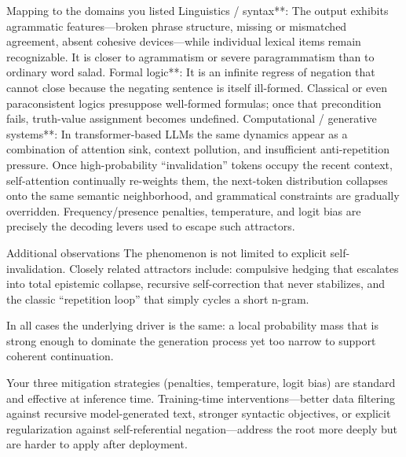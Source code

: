 Mapping to the domains you listed
Linguistics / syntax**: The output exhibits agrammatic features—broken phrase structure, missing or mismatched agreement, absent cohesive devices—while individual lexical items remain recognizable. It is closer to agrammatism or severe paragrammatism than to ordinary word salad.
Formal logic**: It is an infinite regress of negation that cannot close because the negating sentence is itself ill-formed. Classical or even paraconsistent logics presuppose well-formed formulas; once that precondition fails, truth-value assignment becomes undefined.
Computational / generative systems**: In transformer-based LLMs the same dynamics appear as a combination of attention sink, context pollution, and insufficient anti-repetition pressure. Once high-probability “invalidation” tokens occupy the recent context, self-attention continually re-weights them, the next-token distribution collapses onto the same semantic neighborhood, and grammatical constraints are gradually overridden. Frequency/presence penalties, temperature, and logit bias are precisely the decoding levers used to escape such attractors.

Additional observations
The phenomenon is not limited to explicit self-invalidation. Closely related attractors include:
compulsive hedging that escalates into total epistemic collapse,
recursive self-correction that never stabilizes,
and the classic “repetition loop” that simply cycles a short n-gram.

In all cases the underlying driver is the same: a local probability mass that is strong enough to dominate the generation process yet too narrow to support coherent continuation.

Your three mitigation strategies (penalties, temperature, logit bias) are standard and effective at inference time. Training-time interventions—better data filtering against recursive model-generated text, stronger syntactic objectives, or explicit regularization against self-referential negation—address the root more deeply but are harder to apply after deployment.
